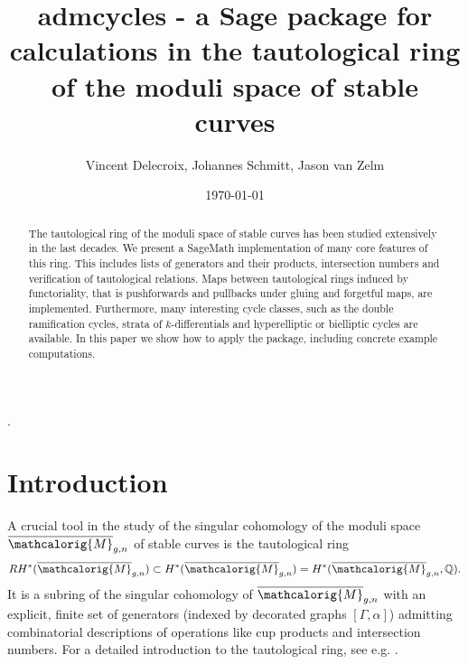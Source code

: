 \documentclass[11pt]{article}
\title{admcycles - a {S}age package for calculations in the tautological ring of the moduli space of stable curves}
\author{Vincent Delecroix, Johannes Schmitt, Jason van Zelm}
\date{\today}
\newcommand{\M}{\ensuremath{\overline{\mathcalorig{M}}}}
\newcommand{\Sage}{SageMath}
\begin{document}

\maketitle



  {}%
  {}%
  {\it}%
  {}%
  {\bfseries}%
  {.}%
  { }%
  {}%

 \theoremstyle{test}
\newtheorem{Def}{Definition}[section]
\newtheorem{Exa}[Def]{Example}
\newtheorem{Rmk}[Def]{Remark}
\newtheorem{Exe}[Def]{Exercise}
\newtheorem{Theo}[Def]{Theorem}
\newtheorem{Lem}[Def]{Lemma}
\newtheorem{Cor}[Def]{Corollary}
\newtheorem{Pro}[Def]{Proposition}
\newtheorem*{Rmk*}{Remark}   %
\newtheorem*{Exa*}{Example}   %
\newtheorem*{Pro*}{Proposition} %
\newtheorem*{Def*}{Definition}
\newtheorem*{Cor*}{Corollary}
\newtheorem*{Lem*}{Lemma}
\newtheorem*{Theo*}{Theorem}

\begin{abstract}
 The tautological ring of the moduli space of stable curves has been studied extensively in the last decades. We present a \Sage{} implementation of many core features of this ring. This includes lists of generators and their products, intersection numbers and verification of tautological relations. Maps between tautological rings induced by functoriality, that is pushforwards and pullbacks under gluing and forgetful maps, are implemented. Furthermore, many interesting cycle classes, such as the double ramification cycles, strata of $k$-differentials and hyperelliptic or bielliptic cycles are available. In this paper we show how to apply the package, including concrete example computations.
\end{abstract}


\section{Introduction}
A crucial tool in the study of the singular cohomology of the moduli space $\M_{g,n}$ of stable curves is the tautological ring \[RH^*(\M_{g,n}) \subset H^*(\M_{g,n}) = H^*(\M_{g,n}, \mathbb{Q}).\]
It is a subring of the singular cohomology of $\M_{g,n}$ with an explicit, finite set of generators (indexed by decorated graphs $[\Gamma, \alpha]$) admitting combinatorial descriptions of operations like cup products and intersection numbers.
For a detailed introduction to the tautological ring, see e.g. \cite{faber2000,Arbarello2011,calcmodcurves}.
\end{document}
